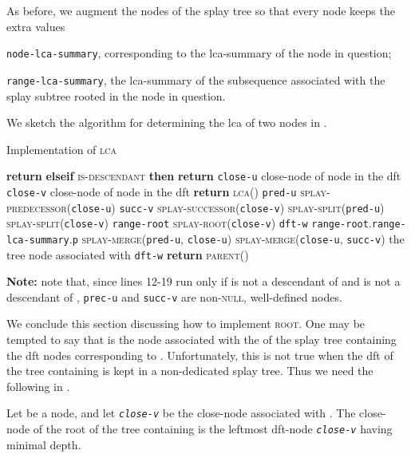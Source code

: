 \documentclass[a4paper,USenglish]{lipics}
\newcommand{\var}[1]{\textrm{\texttt{#1}}}
\begin{document}
			As before, we augment the nodes of the splay tree so that every node keeps the extra values
			\begin{compactitem}
				\item \var{node-lca-summary}, corresponding to the lca-summary of the node in question;
				\item \var{range-lca-summary}, the lca-summary of the subsequence associated with the splay subtree rooted in the node in question.
			\end{compactitem}
			
			We sketch the algorithm for determining the lca of two nodes in .
			\begin{algorithm}[H]
			  \small
			  \caption{\small Implementation of \textsc{lca}}
			  \label{algo:lca}
			  \begin{algorithmic}[1]
				    	\State \textbf{return} 
				    \State\hspace{-\algorithmicindent}\textbf{elseif} \textsc{is-descendant} \textbf{then}
				    	\State \textbf{return} 
				    \EndIf
				    \State \var{close-u}  close-node of node  in the dft
				    \State \var{close-v}  close-node of node  in the dft
				    \If{\textsc{splay-precedes}(\var{close-v},\var{close-u})}
				    	\State \textbf{return} \textsc{lca}()
				    \Else
				    	\State \var{pred-u}  \textsc{splay-predecessor}(\var{close-u})
				    	\State \var{succ-v}  \textsc{splay-successor}(\var{close-v})
				    	\State \textsc{splay-split}(\var{pred-u})
				    	\State \textsc{splay-split}(\var{close-v})
				   		\State \var{range-root}  \textsc{splay-root}(\var{close-v})
				   		\State \var{dft-w}  \var{range-root}.\var{range-lca-summary}.\var{p}
				   		\State \textsc{splay-merge}(\var{pred-u}, \var{close-u})
				   		\State \textsc{splay-merge}(\var{close-u}, \var{succ-v})
				   		\State   the tree node associated with \var{dft-w}
				   		\State \textbf{return} \textsc{parent}()
				    \EndIf
			    \EndProcedure
			  \end{algorithmic}
			  \textbf{Note:} note that, since lines 12-19 run only if  is not a descendant of  and  is not a descendant of , \var{prec-u} and \var{succ-v} are non-\textsc{null}, well-defined nodes.
			\end{algorithm}	
			
We conclude this section discussing how to implement \textsc{root}. One may be tempted to say that  is the node associated with the  of the splay tree containing the dft nodes corresponding to . Unfortunately, this is not true when the dft of the tree containing  is kept in a non-dedicated splay tree. Thus we need the following in .
			\begin{lemma}
				\label{prop:characterization of root}
				Let  be a node, and let \emph{\var{close-v}} be the close-node associated with . The close-node of the root of the tree containing  is the leftmost dft-node  \emph{\var{close-v}} having minimal depth.
			\end{lemma}			
\end{document}
